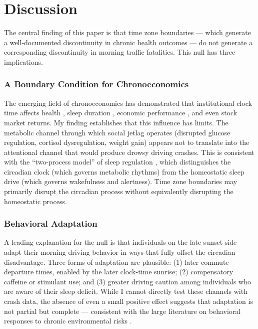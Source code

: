 \documentclass[12pt]{article}
\begin{document}
\section{Discussion}

The central finding of this paper is that time zone boundaries --- which generate a well-documented discontinuity in chronic health outcomes --- do not generate a corresponding discontinuity in morning traffic fatalities. This null has three implications.

\subsubsection*{A Boundary Condition for Chronoeconomics} The emerging field of chronoeconomics has demonstrated that institutional clock time affects health \citep{giuntella2019sunset}, sleep duration \citep{roenneberg2012social}, economic performance \citep{gibson2015time}, and even stock market returns. My finding establishes that this influence has limits. The metabolic channel through which social jetlag operates (disrupted glucose regulation, cortisol dysregulation, weight gain) appears not to translate into the attentional channel that would produce drowsy driving crashes. This is consistent with the ``two-process model'' of sleep regulation \citep{borbely1982sleep}, which distinguishes the circadian clock (which governs metabolic rhythms) from the homeostatic sleep drive (which governs wakefulness and alertness). Time zone boundaries may primarily disrupt the circadian process without equivalently disrupting the homeostatic process.

\subsubsection*{Behavioral Adaptation} A leading explanation for the null is that individuals on the late-sunset side adapt their morning driving behavior in ways that fully offset the circadian disadvantage. Three forms of adaptation are plausible: (1) later commute departure times, enabled by the later clock-time sunrise; (2) compensatory caffeine or stimulant use; and (3) greater driving caution among individuals who are aware of their sleep deficit. While I cannot directly test these channels with crash data, the absence of even a small positive effect suggests that adaptation is not partial but complete --- consistent with the large literature on behavioral responses to chronic environmental risks \citep{deschenes2014temperature}.
\end{document}

